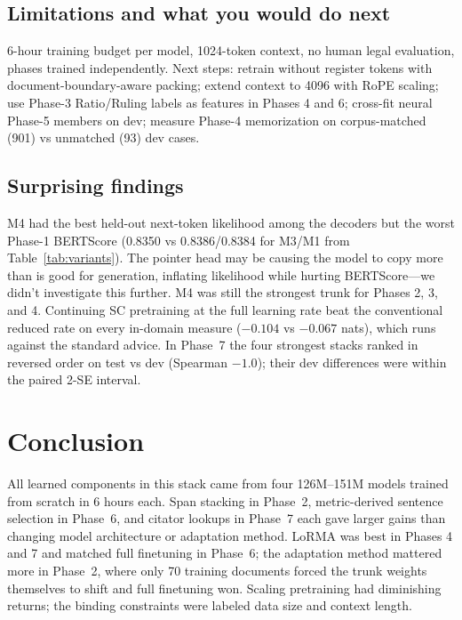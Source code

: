 \documentclass[11pt, oneside]{article}
\begin{document}
\subsection{Limitations and what you would do next}
6-hour training budget per model, 1024-token context, no human legal evaluation, phases trained
independently. Next steps: retrain without register tokens with document-boundary-aware packing; extend
context to 4096 with RoPE scaling; use Phase-3 Ratio/Ruling labels as features in Phases 4 and 6;
cross-fit neural Phase-5 members on dev; measure Phase-4 memorization on corpus-matched (901) vs
unmatched (93) dev cases.

\subsection{Surprising findings}
M4 had the best held-out next-token likelihood among the decoders but the worst Phase-1 BERTScore
(0.8350 vs 0.8386/0.8384 for M3/M1 from Table~\ref{tab:variants}). The pointer head may be causing the
model to copy more than is good for generation, inflating likelihood while hurting BERTScore---we didn't
investigate this further. M4 was still the strongest trunk for Phases 2, 3, and 4. Continuing SC
pretraining at the full learning rate beat the conventional reduced rate on every in-domain measure
($-0.104$ vs $-0.067$ nats), which runs against the standard advice. In Phase~7 the four strongest stacks
ranked in reversed order on test vs dev (Spearman $-1.0$); their dev differences were within the paired
2-SE interval.

\section{Conclusion}
All learned components in this stack came from four 126M--151M models trained from scratch in 6 hours
each. Span stacking in Phase~2, metric-derived sentence selection in Phase~6, and citator lookups in
Phase~7 each gave larger gains than changing model architecture or adaptation method. LoRMA was best in
Phases 4 and 7 and matched full finetuning in Phase~6; the adaptation method mattered more in Phase~2,
where only 70 training documents forced the trunk weights themselves to shift and full finetuning won.
Scaling pretraining had diminishing returns; the binding constraints were labeled data size and context
length.
\end{document}
